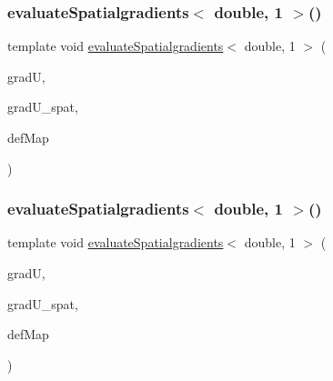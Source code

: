 \mbox{\label{function_evaluations_8cc_a629c7bb265581b5853dbfb9af43c4a0a}} 
\subsubsection{\texorpdfstring{evaluateSpatialgradients$<$ double, 1 $>$()}{evaluateSpatialgradients< double, 1 >()}\hspace{0.1cm}{\footnotesize\ttfamily [1/2]}}
{\footnotesize\ttfamily template void \mbox{\hyperlink{group___evaluation_functions_ga0b976342d491f6215953e2e65ea6a0de}{evaluate\+Spatialgradients}}$<$ double, 1 $>$ (\begin{DoxyParamCaption}\item[{Table$<$ 2, double $>$ \&}]{gradU,  }\item[{Table$<$ 2, double $>$}]{grad\+U\+\_\+spat,  }\item[{\mbox{\hyperlink{structdeformation_map}{deformation\+Map}}$<$ double, 1 $>$ \&}]{def\+Map }\end{DoxyParamCaption})}

\mbox{\label{function_evaluations_8cc_a688e887a593bf0c3effebec8495fb849}} 
\subsubsection{\texorpdfstring{evaluateSpatialgradients$<$ double, 1 $>$()}{evaluateSpatialgradients< double, 1 >()}\hspace{0.1cm}{\footnotesize\ttfamily [2/2]}}
{\footnotesize\ttfamily template void \mbox{\hyperlink{group___evaluation_functions_ga0b976342d491f6215953e2e65ea6a0de}{evaluate\+Spatialgradients}}$<$ double, 1 $>$ (\begin{DoxyParamCaption}\item[{Table$<$ 3, double $>$ \&}]{gradU,  }\item[{Table$<$ 3, double $>$}]{grad\+U\+\_\+spat,  }\item[{\mbox{\hyperlink{structdeformation_map}{deformation\+Map}}$<$ double, 1 $>$ \&}]{def\+Map }\end{DoxyParamCaption})}

